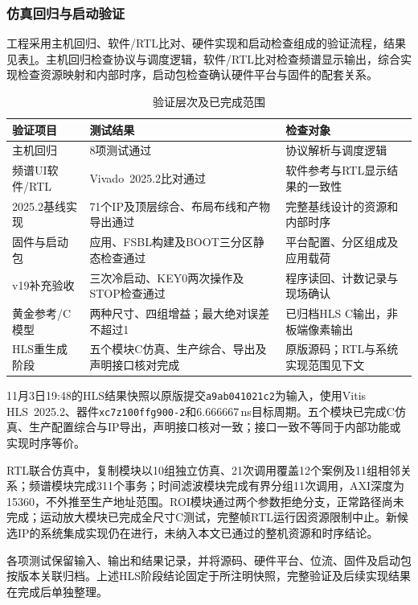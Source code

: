\subsubsection{仿真回归与启动验证}
工程采用主机回归、软件/RTL比对、硬件实现和启动检查组成的验证流程，结果见表\ref{tab:validation-results}。主机回归检查协议与调度逻辑，软件/RTL比对检查频谱显示输出，综合实现检查资源映射和内部时序，启动包检查确认硬件平台与固件的配套关系。

\begin{table}[htbp]
\centering\small
\caption{验证层次及已完成范围}\label{tab:validation-results}
\begin{tabularx}{\linewidth}{@{}p{3.1cm}X p{4.1cm}@{}}
\toprule
验证项目 & 测试结果 & 检查对象 \\
\midrule
主机回归 & 8项测试通过 & 协议解析与调度逻辑 \\
频谱UI软件/RTL & Vivado~2025.2比对通过 & 软件参考与RTL显示结果的一致性 \\
2025.2基线实现 & 71个IP及顶层综合、布局布线和产物导出通过 & 完整基线设计的资源和内部时序 \\
固件与启动包 & 应用、FSBL构建及BOOT三分区静态检查通过 & 平台配置、分区组成及应用载荷 \\
v19补充验收 & 三次冷启动、KEY0两次操作及STOP检查通过 & 程序读回、计数记录与现场确认 \\
黄金参考/C模型 & 两种尺寸、四组增益；最大绝对误差不超过1 & 已归档HLS C输出，非板端像素输出 \\
HLS重生成阶段 & 五个模块C仿真、生产综合、导出及声明接口核对完成 & 原版源码；RTL与系统实现范围见下文 \\
\bottomrule
\end{tabularx}
\end{table}

11月3日19:48的HLS结果快照以原版提交\texttt{a9ab041021c2}为输入，使用Vitis HLS~2025.2、器件\texttt{xc7z100ffg900-2}和6.666667\,ns目标周期。五个模块已完成C仿真、生产配置综合与IP导出，声明接口核对一致；接口一致不等同于内部功能或实现时序等价。

RTL联合仿真中，复制模块以10组独立仿真、21次调用覆盖12个案例及11组相邻关系；频谱模块完成311个事务；时间滤波模块完成有界分组11次调用，AXI深度为15360，不外推至生产地址范围。ROI模块通过两个参数拒绝分支，正常路径尚未完成；运动放大模块已完成全尺寸C测试，完整帧RTL运行因资源限制中止。新候选IP的系统集成实现仍在进行，未纳入本文已通过的整机资源和时序结论。

各项测试保留输入、输出和结果记录，并将源码、硬件平台、位流、固件及启动包按版本关联归档。上述HLS阶段结论固定于所注明快照，完整验证及后续实现结果在完成后单独整理。

